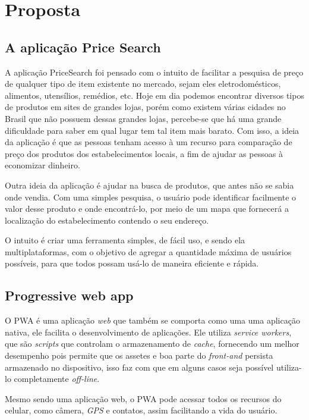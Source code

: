 \section{Proposta}
\label{sec:proposta}

\subsection{A aplicação Price Search}

A aplicação PriceSearch foi pensado com o intuito de facilitar a pesquisa de preço de qualquer tipo de item existente no mercado, sejam eles eletrodomésticos, alimentos, utensílios, remédios, etc. Hoje em dia podemos encontrar diversos tipos de produtos em sites de grandes lojas, porém como existem várias cidades no Brasil que não possuem dessas grandes lojas, percebe-se que há uma grande dificuldade para saber em qual lugar tem tal item mais barato. Com isso, a ideia da aplicação é que as pessoas tenham acesso à um recurso para comparação de preço dos produtos dos estabelecimentos locais, a fim de ajudar as pessoas à economizar dinheiro. 

Outra ideia da aplicação é ajudar na busca de produtos, que antes não se sabia onde vendia. Com uma simples pesquisa, o usuário pode identificar facilmente o valor desse produto e onde encontrá-lo, por meio de um mapa que fornecerá a localização do estabelecimento contendo o seu endereço.

O intuito é criar uma ferramenta simples, de fácil uso, e sendo ela multiplataformas, com o objetivo de agregar a quantidade máxima de usuários possíveis, para que todos possam usá-lo de maneira eficiente e rápida.

\subsection{Progressive web app}

O PWA é uma aplicação \textit{web} que também se comporta como uma uma aplicação nativa, ele facilita o desenvolvimento de aplicações. Ele utiliza \textit{service workers}, que são \textit{scripts} que controlam o armazenamento de \textit{cache}, fornecendo um melhor desempenho pois permite que os assetes e boa parte do \textit{front-and} persista armazenado no dispositivo, isso faz com que em alguns casos seja possível utiliza-lo completamente \textit{off-line}.

Mesmo sendo uma aplicação web, o PWA pode acessar todos os recursos do celular, como câmera, \textit{GPS} e contatos, assim facilitando a vida do usuário.

